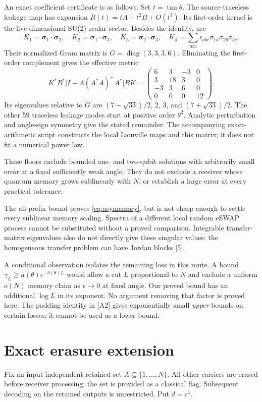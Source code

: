 \documentclass[11pt,a4paper]{article}
\begin{document}
An exact coefficient certificate is as follows. Set $t=\tan\theta$. The source-traceless leakage map has expansion $R(t)=tA+t^2B+O(t^3)$. Its first-order kernel is the five-dimensional SU(2)-scalar sector. Besides the identity, use
\[
 K_1=\boldsymbol\sigma_1\!\cdot\!\boldsymbol\sigma_2,\quad
 K_2=\boldsymbol\sigma_1\!\cdot\!\boldsymbol\sigma_3,\quad
 K_3=\boldsymbol\sigma_2\!\cdot\!\boldsymbol\sigma_3,\quad
 K_4=\sum_{abc}\epsilon_{abc}\sigma_{1a}\sigma_{2b}\sigma_{3c}.
\]
Their normalized Gram matrix is $G=\operatorname{diag}(3,3,3,6)$. Eliminating the first-order complement gives the effective metric
\[
 K^*B^*\bigl[I-A(A^*A)^+A^*\bigr]BK
 =\begin{pmatrix}6&3&-3&0\\3&18&3&0\\-3&3&6&0\\0&0&0&12\end{pmatrix}.
\]
Its eigenvalues relative to $G$ are $(7-\sqrt{33})/2$, $2$, $3$, and $(7+\sqrt{33})/2$. The other 59 traceless leakage modes start at positive order $\theta^2$. Analytic perturbation and angle-sign symmetry give the stated remainder. The accompanying exact-arithmetic script constructs the local Liouville maps and this matrix; it does not fit a numerical power law.

These floors exclude bounded one- and two-qubit solutions with arbitrarily small error at a fixed sufficiently weak angle. They do not exclude a receiver whose quantum memory grows sublinearly with $N$, or establish a large error at every practical tolerance.

The all-prefix bound proves \eqref{eq:asymemory}, but is not sharp enough to settle every sublinear memory scaling. Spectra of a different local random eSWAP process cannot be substituted without a proved comparison. Integrable transfer-matrix eigenvalues also do not directly give these singular values: the homogeneous transfer problem can have Jordan blocks [5].

A conditional observation isolates the remaining loss in this route. A bound $\gamma_L\ge a(\theta)e^{-b(\theta)L}$ would allow a cut $L$ proportional to $N$ and exclude a uniform $o(N)$ memory claim as $\epsilon\to0$ at fixed angle. Our proved bound has an additional $\log L$ in its exponent. No argument removing that factor is proved here. The padding identity in [A2] gives exponentially small \emph{upper} bounds on certain losses; it cannot be used as a lower bound.

\section{Exact erasure extension}
Fix an input-independent retained set $A\subseteq\{1,\ldots,N\}$. All other carriers are erased before receiver processing; the set is provided as a classical flag. Subsequent decoding on the retained outputs is unrestricted. Put $d=c^4$.
\end{document}
